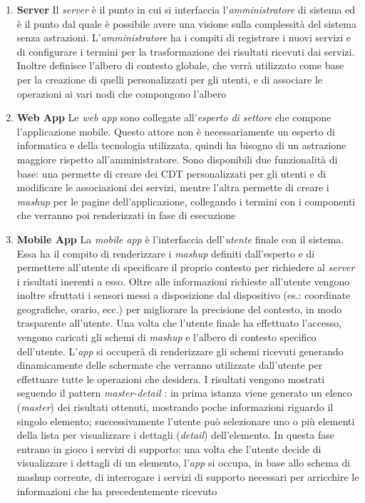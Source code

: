 \begin{enumerate}
	\item \textbf{Server}
	Il \emph{server} è il punto in cui si interfaccia l'\emph{amministratore} di sistema ed è il punto dal quale è possibile avere una visione sulla complessità del sistema senza astrazioni. L'\emph{amministratore} ha i compiti di registrare i nuovi servizi e di configurare i termini per la trasformazione dei risultati ricevuti dai servizi. Inoltre definisce l'albero di contesto globale, che verrà utilizzato come base per la creazione di quelli personalizzati per gli utenti, e di associare le operazioni ai vari nodi che compongono l'albero
	\item \textbf{Web App}
	Le \emph{web app} sono collegate all'\emph{esperto di settore} che compone l'applicazione mobile. Questo attore non è necessariamente un esperto di informatica e della tecnologia utilizzata, quindi ha bisogno di un astrazione maggiore rispetto all'amministratore. Sono disponibili due funzionalità di base: una permette di creare dei CDT personalizzati per gli utenti e di modificare le associazioni dei servizi, mentre l'altra permette di creare i \emph{mashup} per le pagine dell'applicazione, collegando i termini con i componenti che verranno poi renderizzati in fase di esecuzione
	\item \textbf{Mobile App}
	La \emph{mobile app} è l'interfaccia dell'\emph{utente} finale con il sistema. Essa ha il compito di renderizzare i \emph{mashup} definiti dall'esperto e di permettere all'utente di specificare il proprio contesto per richiedere al \emph{server} i risultati inerenti a esso. Oltre alle informazioni richieste all'utente vengono inoltre sfruttati i sensori messi a disposizione dal dispositivo (es.: coordinate geografiche, orario, ecc.) per migliorare la precisione del contesto, in modo trasparente all'utente.
	Una volta che l'utente finale ha effettuato l'accesso, vengono caricati gli schemi di \emph{mashup} e l'albero di contesto specifico dell'utente. L'\emph{app} si occuperà di renderizzare gli schemi ricevuti generando dinamicamente delle schermate che verranno utilizzate dall'utente per effettuare tutte le operazioni che desidera.
	I risultati vengono mostrati seguendo il pattern \emph{master-detail} \cite{molina2002user}: in prima istanza viene generato un elenco (\emph{master}) dei risultati ottenuti, mostrando poche informazioni riguardo il singolo elemento; successivamente l'utente può selezionare uno o più elementi della lista per visualizzare i dettagli (\emph{detail}) dell'elemento. In questa fase entrano in gioco i servizi di supporto: una volta che l'utente decide di visualizzare i dettagli di un elemento, l'\emph{app} si occupa, in base allo schema di mashup corrente, di interrogare i servizi di supporto necessari per arricchire le informazioni che ha precedentemente ricevuto
\end{enumerate}

